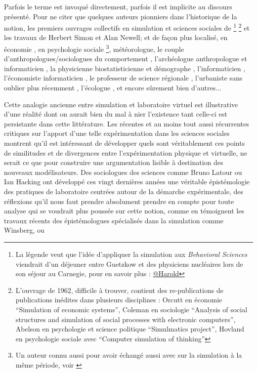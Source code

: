Parfois le terme est invoqué directement, parfois il est implicite au discours présenté. Pour ne citer que quelques auteurs pionniers dans l'historique de la notion, les premiers ouvrages collectifs en simulation et sciences sociales de \textcite{Borko1962, Guetzkow1962, Guetzkow1972} \footnote{La légende veut que l'idée d'appliquer la simulation aux \textit{Behavioral Sciences} viendrait d'un déjeuner entre Guetzkow et des physiciens nucléaires lors de son séjour au Carnegie, pour en savoir plus : \href{http://www.hawaii.edu/intlrel/pols635f/Guetzkow/hg.html}{@Harold} } \footnote{L'ouvrage de 1962, difficile à trouver, contient des re-publications de publications inédites dans plusieurs disciplines : Orcutt en économie \foreignquote{english}{Simulation of economic systems}, Coleman en sociologie \foreignquote{english}{Analysis of social structures and simulation of social processes with electronic computers}, Abelson en psychologie et science politique \foreignquote{english}{Simulmatics project},  Hovland en psychologie sociale avec \foreignquote{english}{Computer simulation of thinking} } et les travaux de Herbert Simon et Alan Newell; et de façon plus localisé, en économie \textcite[915]{Shubik1960b}, en psychologie sociale \textcite{Abelson1968} \footnote{Un auteur connu aussi pour avoir échangé aussi avec \textcite{Boudon1967} sur la simulation à la même période, voir \textcite{Padioleau1969}}, \textcite{Fleisher1965} météorologue, le couple d'anthropologues/sociologues du comportement \textcite{Gullahorn1965}, l'archéologue anthropologue et informaticien \textcite{Doran1970}, la physicienne biostatisticienne et démographe \textcite{Sheps1971}, l'informaticien \textcite[3-4]{Forrester1971}, l'économiste informaticien \textcite{Naylor1966}, le professeur de science régionale \textcite[271]{Harris1966}, l'urbaniste \textcite[295]{Batty1976} sans oublier plus récemment \textcite{Epstein1996}, l'écologue \textcite{Grimm2006}, et encore sûrement bien d'autres...

Cette analogie ancienne entre simulation et laboratoire virtuel est illustrative d'une réalité dont on aurait bien du mal à nier l'existence tant celle-ci est persistante dans cette littérature. Les récentes et au moins tout aussi récurrentes critiques sur l'apport d'une telle expérimentation dans les sciences sociales montrent qu'il est intéressant de développer quels sont véritablement ces points de similitudes et de divergences entre l'expérimentation physique et virtuelle, ne serait ce que pour construire une argumentation lisible à destination des nouveaux modélisateurs. Des sociologues des sciences comme Bruno Latour ou Ian Hacking ont développé ces vingt dernières années une véritable épistémologie des pratiques de laboratoire centrées autour de la démarche expérimentale, des réflexions qu'il nous faut prendre absolument prendre en compte pour toute analyse qui se voudrait plus poussée sur cette notion, comme en témoignent les travaux récents des épistémologues spécialisés dans la simulation comme Winsberg, ou \textcite[204]{Varenne2012}

